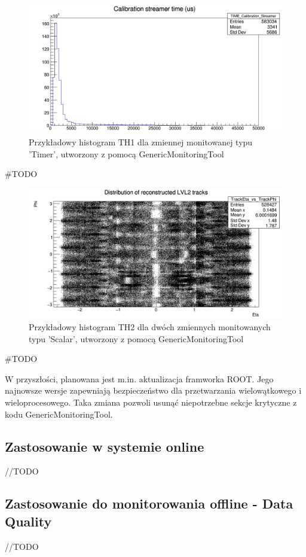 \begin{figure}[!ht]
\centering
\includegraphics[width=1\textwidth]{img/histogram_TH1_time.png}
\caption{
Przykładowy histogram TH1 dla zmiennej monitowanej typu 'Timer', utworzony z pomocą GenericMonitoringTool 
}
\label{fig:athena:histogram_TH1_time}
\end{figure}

\begin{python}[caption=TH1 Time, label={lst:athena:histogram_TH1_time}]
#TODO
\end{python}

\begin{figure}[!ht]
\centering
\includegraphics[width=1\textwidth]{img/histogram_TH2.png}
\caption{
Przykładowy histogram TH2 dla dwóch zmiennych monitowanych typu 'Scalar', utworzony z pomocą GenericMonitoringTool 
}
\label{fig:athena:histogram_TH2}
\end{figure}

\begin{python}[caption=TH2 Scalar, label={lst:athena:histogram_TH2}]
#TODO
\end{python}

W przyszłości, planowana jest m.in. aktualizacja framworka ROOT.
Jego najnowsze wersje zapewniają bezpieczeństwo dla przetwarzania wielowątkowego i wieloprocesowego. 
Taka zmiana pozwoli usunąć niepotrzebne sekcje krytyczne z kodu GenericMonitoringTool.

\subsection{Zastosowanie w systemie online}
//TODO
\subsection{Zastosowanie do monitorowania offline - Data Quality}
//TODO~\cite{atlas-multithread-article}